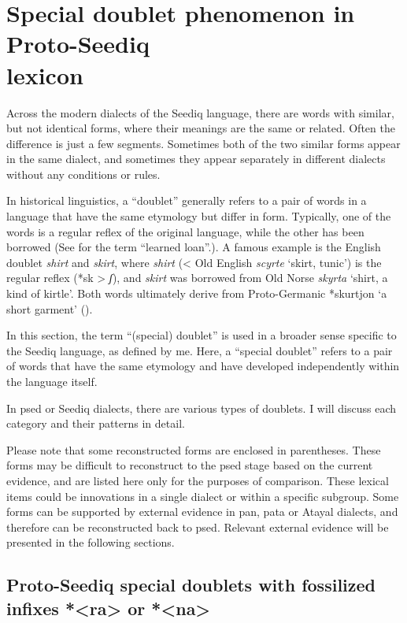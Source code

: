 \section[Special doublet phenomenon in Proto-Seediq lexicon]{Special doublet phenomenon in Proto-Seediq\\ lexicon} \label{sec:sepical_doublet}

Across the modern dialects of the Seediq language, there are words with similar, but not identical forms, where their meanings are the same or related. Often the difference is just a few segments. Sometimes both of the two similar forms appear in the same dialect, and sometimes they appear separately in different dialects without any conditions or rules. 

In historical linguistics, a ``doublet'' generally refers to a pair of words in a language that have the same etymology but differ in form. Typically, one of the words is a regular reflex of the original language, while the other has been borrowed (See \textcite[99]{campbell2007HLglossary} for the term ``learned loan''.). A famous example is the English doublet \textit{shirt} and \textit{skirt}, where \textit{shirt} (< Old English \textit{scyrte} `skirt, tunic') is the regular reflex (*sk > \textit{ʃ}), and \textit{skirt} was borrowed from Old Norse \textit{skyrta} `shirt, a kind of kirtle'. Both words ultimately derive from Proto-Germanic *skurtjon `a short garment' (\cite[70]{campbell2021histling}).

In this section, the term ``(special) doublet'' is used in a broader sense specific to the Seediq language, as defined by me. Here, a ``special doublet'' refers to a pair of words that have the same etymology and have developed independently within the language itself.

In \acl{psed} or Seediq dialects, there are various types of doublets. I will discuss each category and their patterns in detail.

Please note that some reconstructed forms are enclosed in parentheses. These forms may be difficult to reconstruct to the \acl{psed} stage based on the current evidence, and are listed here only for the purposes of comparison. These lexical items could be innovations in a single dialect or within a specific subgroup. Some forms can be supported by external evidence in \acl{pan}, \acl{pata} or Atayal dialects, and therefore can be reconstructed back to \acl{psed}. Relevant external evidence will be presented in the following sections.

\subsection{Proto-Seediq special doublets with fossilized infixes *<ra> or *<na>}

